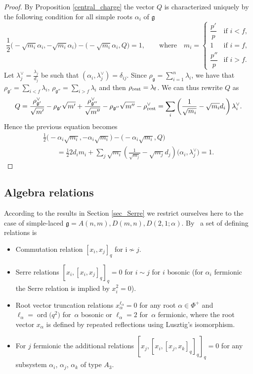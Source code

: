 \documentclass[pdftex]{sigma}%
\numberwithin{equation}{section}
\renewcommand{\i}{\mathrm{i}}
\newcommand{\g}{\mathfrak{g}}
\newcommand{\f}{\mathsf{f}}
\begin{document}
\begin{proof}By Proposition \ref{central_charge} the vector $Q$ is characterized uniquely by the following condition for all simple roots $\alpha_i$ of $\mathfrak{g}$
\[
\frac{1}{2}\big({-}\sqrt{m_i}\alpha_i,-\sqrt{m_i}\alpha_i\big) -\big({-}\sqrt{m_i}\alpha_i,Q\big) =1, \qquad \text{where}\quad m_i = \begin{cases} \dfrac{p'}{p} & \text{if } i<f,\\
1 & \text{if } i=f,\\
 \dfrac{p''}{p} &  \text{if } i>f.
\end{cases}
\]
Let $\lambda_j^\vee= \frac{\lambda_j}{d_j}$ be such that $(\alpha_i, \lambda_j^\vee) = \delta_{ij}$. Since $\rho_\mathfrak{g}= \sum\limits_{i=1}^n \lambda_i$, we have that $\rho_{\mathfrak{g'}}= \sum\limits_{i<f} \lambda_i$, $\rho_{\mathfrak{g''}}= \sum\limits_{i>f} \lambda_i$ and then $\rho_{{\rm rest}} = \lambda_\f$. We can thus rewrite $Q$ as
\begin{gather*}
Q=\frac{\rho_{\mathfrak{g'}}^\vee}{\sqrt{m'}}-\rho_{\mathfrak{g'}}\sqrt{m'}+\frac{\rho_{\mathfrak{g''}}^\vee}{\sqrt{m''}}-\rho_{\mathfrak{g''}}\sqrt{m''}-\rho_{{\rm rest}}^\vee
= \sum\limits_i\left( \frac{1}{\sqrt{m_i}}-\sqrt{m_i}d_i\right) \lambda_i^\vee.
\end{gather*}
Hence the previous equation becomes
\begin{gather*}
 \frac{1}{2}\big({-}\alpha_i \sqrt{m_i},-\alpha_i \sqrt{m_i}\big)-\big({-}\alpha_i \sqrt{m_i}, Q\big) \\
\qquad{}= \frac{1}{2} 2d_i m_i+ \sum\limits_j \sqrt{m_i} \left(\frac{1}{ \sqrt{m_j}}- \sqrt{m_j} d_j\right) \big(\alpha_i, \lambda_j^\vee\big) =1.\tag*{\qed}
\end{gather*}\renewcommand{\qed}{}
\end{proof}

\subsection{Algebra relations}\label{sec_SuperNA}

 According to the results in Section \ref{sec_Serre} we restrict ourselves here to the case of simple-laced $\g=A(n,m),D(m,n),D(2,1;\alpha)$. By~\cite[Sections~4.1,~4.4 and~4.5]{AA17} a set of defining relations is
 \begin{itemize}\itemsep=0pt
 	\item Commutation relation $[x_i,x_j]_q$ for $\i\not\sim j$.
 	\item Serre relations $[x_i,[x_i,x_j]_q]_q=0$ for $i\sim j$ for $i$ bosonic (for $\alpha_i$ fermionic the Serre relation is implied by $x_i^2=0$).
 	\item Root vector truncation relations $x_\alpha^{\ell_\alpha}=0$ for any root $\alpha\in\Phi^+$ and $\ell_\alpha=\operatorname{ord}\big(q^{2}\big)$ for~$\alpha$ bosonic or $\ell_\alpha=2$ for~$\alpha$ fermionic, where the root vector $x_\alpha$ is defined by repeated reflections using Lusztig's isomorphism.
 	\item For $j$ fermionic the additional relations $[x_j,[x_i,[x_j,x_k]_q]_q]_q=0$ for any subsystem $\alpha_i$, $\alpha_j$, $\alpha_k$ of type $A_3$.
 \end{itemize}
\end{document}
